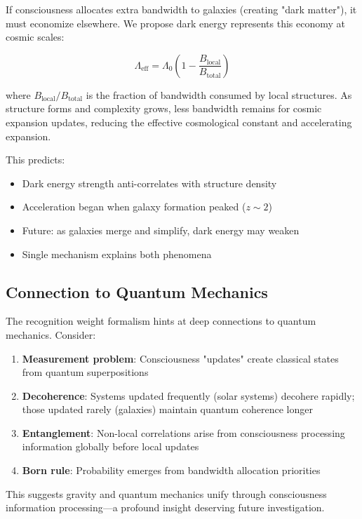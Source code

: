 \documentclass[twocolumn,prd,amsmath,amssymb,aps,superscriptaddress,nofootinbib]{revtex4-2}
\begin{document}
If consciousness allocates extra bandwidth to galaxies (creating "dark matter"), it must economize elsewhere. We propose dark energy represents this economy at cosmic scales:

\begin{equation}
\Lambda_{\text{eff}} = \Lambda_0 \left(1 - \frac{B_{\text{local}}}{B_{\text{total}}}\right)
\label{eq:dark_energy}
\end{equation}

where $B_{\text{local}}/B_{\text{total}}$ is the fraction of bandwidth consumed by local structures. As structure forms and complexity grows, less bandwidth remains for cosmic expansion updates, reducing the effective cosmological constant and accelerating expansion.

This predicts:
\begin{itemize}
\item Dark energy strength anti-correlates with structure density
\item Acceleration began when galaxy formation peaked ($z \sim 2$)
\item Future: as galaxies merge and simplify, dark energy may weaken
\item Single mechanism explains both phenomena
\end{itemize}

\subsection{Connection to Quantum Mechanics}

The recognition weight formalism hints at deep connections to quantum mechanics. Consider:

\begin{enumerate}
\item \textbf{Measurement problem}: Consciousness "updates" create classical states from quantum superpositions
\item \textbf{Decoherence}: Systems updated frequently (solar systems) decohere rapidly; those updated rarely (galaxies) maintain quantum coherence longer
\item \textbf{Entanglement}: Non-local correlations arise from consciousness processing information globally before local updates
\item \textbf{Born rule}: Probability emerges from bandwidth allocation priorities
\end{enumerate}

This suggests gravity and quantum mechanics unify through consciousness information processing---a profound insight deserving future investigation.
\end{document}
